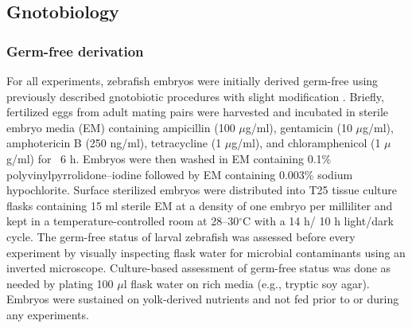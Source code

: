 {{{{{{{\subsection{Gnotobiology}

\subsubsection{Germ-free derivation}
For all experiments, zebrafish embryos were initially derived germ-free using previously described gnotobiotic procedures with slight modification \cite{melancon_best_2017}. Briefly, fertilized eggs from adult mating pairs were harvested and incubated in sterile embryo media (EM) containing ampicillin (100 $\mu$g/ml), gentamicin (10 $\mu$g/ml), amphotericin B (250 ng/ml), tetracycline (1 $\mu$g/ml), and chloramphenicol (1 $\mu$g/ml) for ~6 h. Embryos were then washed in EM containing 0.1\% polyvinylpyrrolidone–iodine followed by EM containing 0.003\% sodium hypochlorite. Surface sterilized embryos were distributed into T25 tissue culture flasks containing 15 ml sterile EM at a density of one embryo per milliliter and kept in a temperature-controlled room at 28–30$^\circ$C with a 14 h/ 10 h light/dark cycle. The germ-free status of larval zebrafish was assessed before every experiment by visually inspecting flask water for microbial contaminants using an inverted microscope. Culture-based assessment of germ-free status was done as needed by plating 100 $\mu$l flask water on rich media (e.g., tryptic soy agar). Embryos were sustained on yolk-derived nutrients and not fed prior to or during any experiments. 

}}}}}}}
